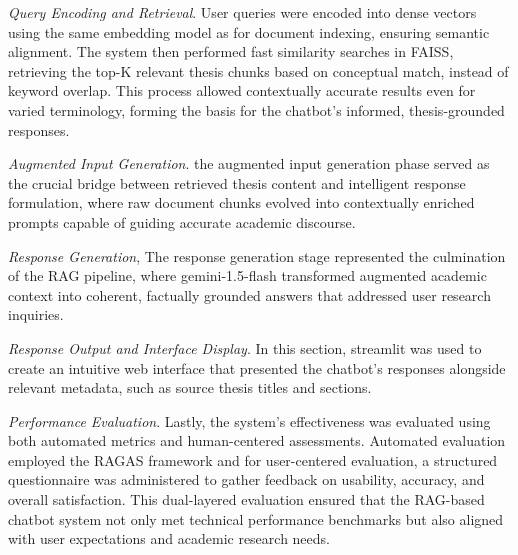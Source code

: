\begin{refsection}
\textit{Query Encoding and Retrieval}. User queries were encoded into dense vectors using the same embedding model as for document indexing, ensuring semantic alignment. The system then performed fast similarity searches in FAISS, retrieving the top-K relevant thesis chunks based on conceptual match, instead of keyword overlap. This process allowed contextually accurate results even for varied terminology, forming the basis for the chatbot's informed, thesis-grounded responses.

\textit{Augmented Input Generation}. the augmented input generation phase served as the crucial bridge between retrieved thesis content and intelligent response formulation, where raw document chunks evolved into contextually enriched prompts capable of guiding accurate academic discourse.

\textit{Response Generation}, The response generation stage represented the culmination of the RAG pipeline, where gemini-1.5-flash transformed augmented academic context into coherent, factually grounded answers that addressed user research inquiries. 

\textit{Response Output and Interface Display}. In this section, streamlit was used to create an intuitive web interface that presented the chatbot's responses alongside relevant metadata, such as source thesis titles and sections.

\textit{Performance Evaluation}. Lastly, the system's effectiveness was evaluated using both automated metrics and human-centered assessments. Automated evaluation employed the RAGAS framework and for user-centered evaluation, a structured questionnaire was administered to gather feedback on usability, accuracy, and overall satisfaction. This dual-layered evaluation ensured that the RAG-based chatbot system not only met technical performance benchmarks but also aligned with user expectations and academic research needs.


\clearpage

\printbibliography[heading=subbibintoc, title={\centering Notes}]
\end{refsection}
